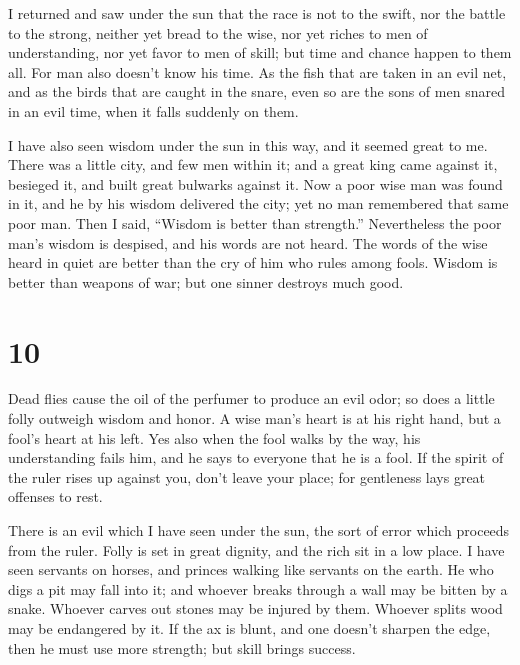  I returned and saw under the sun that the race is not to
the swift, nor the battle to the strong, neither yet bread to the wise,
nor yet riches to men of understanding, nor yet favor to men of skill;
but time and chance happen to them all.  For man also
doesn't know his time. As the fish that are taken in an evil net, and as
the birds that are caught in the snare, even so are the sons of men
snared in an evil time, when it falls suddenly on them.

 I have also seen wisdom under the sun in this way, and
it seemed great to me.  There was a little city, and few
men within it; and a great king came against it, besieged it, and built
great bulwarks against it.  Now a poor wise man was found
in it, and he by his wisdom delivered the city; yet no man remembered
that same poor man.  Then I said, ``Wisdom is better than
strength.'' Nevertheless the poor man's wisdom is despised, and his
words are not heard.  The words of the wise heard in
quiet are better than the cry of him who rules among fools.
 Wisdom is better than weapons of war; but one sinner
destroys much good.

\hypertarget{section-9}{%
\section{10}\label{section-9}}

 Dead flies cause the oil of the perfumer to produce an
evil odor; so does a little folly outweigh wisdom and honor.
 A wise man's heart is at his right hand, but a fool's
heart at his left.  Yes also when the fool walks by the
way, his understanding fails him, and he says to everyone that he is a
fool.  If the spirit of the ruler rises up against you,
don't leave your place; for gentleness lays great offenses to rest.

 There is an evil which I have seen under the sun, the
sort of error which proceeds from the ruler.  Folly is set
in great dignity, and the rich sit in a low place.  I have
seen servants on horses, and princes walking like servants on the earth.
 He who digs a pit may fall into it; and whoever breaks
through a wall may be bitten by a snake.  Whoever carves
out stones may be injured by them. Whoever splits wood may be endangered
by it.  If the ax is blunt, and one doesn't sharpen the
edge, then he must use more strength; but skill brings success.

